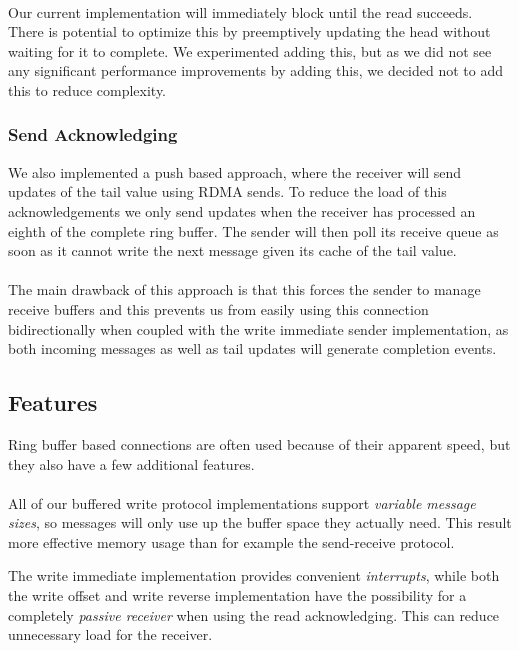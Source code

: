 \paragraph{} Our current implementation will immediately block until the read succeeds. There is potential to optimize this by preemptively 
updating the head without waiting for it to complete. We experimented adding this, but as we did not see any significant 
performance improvements by adding this, we decided not to add this to reduce complexity. 

\subsubsection{Send Acknowledging} 

We also implemented a push based approach, where the receiver will send updates of the tail value using 
RDMA sends. To reduce the load of this acknowledgements we only send updates when the receiver has processed an eighth of 
the complete ring buffer. The sender will then poll its receive queue as soon as it cannot write the next message given its
cache of the tail value.

\paragraph{} The main drawback of this approach is that this forces the sender to manage receive buffers and this prevents
us from easily using this connection bidirectionally when coupled with the write immediate sender implementation, as both 
incoming messages as well as tail updates will generate completion events.

\subsection{Features}

Ring buffer based connections are often used because of their apparent speed, but they also have a few additional features.


\paragraph{} All of our buffered write protocol implementations support \emph{variable message sizes}, so messages will only
use up the buffer space they actually need. This result more effective memory usage than for example the send-receive protocol.

The write immediate implementation provides convenient \emph{interrupts}, while both the write offset and write reverse 
implementation have the possibility for a completely \emph{passive receiver} when using the read acknowledging. This can
reduce unnecessary load for the receiver.

